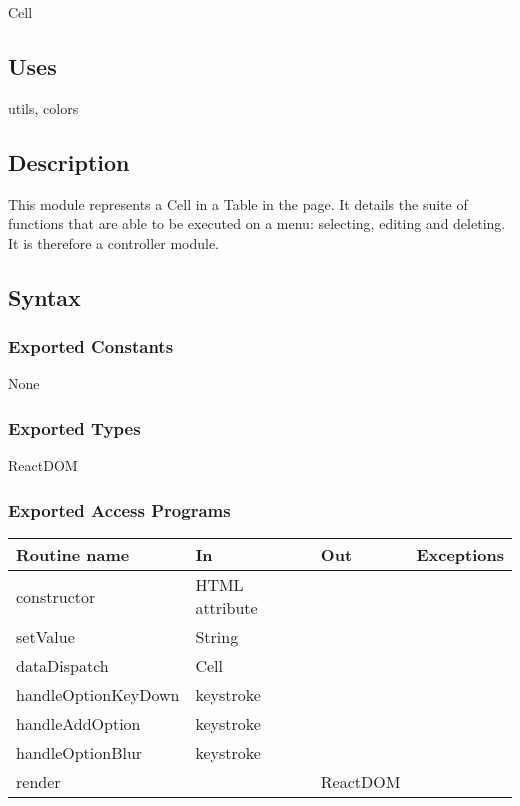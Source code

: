 \documentclass[12pt, titlepage]{article}
\begin{document}
Cell

\subsection{Uses}

utils, colors

\subsection{Description}
This module represents a Cell in a Table in the page. It details the suite of functions that are able to be executed on a menu: selecting, editing and deleting. It is therefore a controller module.

\subsection{Syntax}

\subsubsection{Exported Constants}

None

\subsubsection{Exported Types}

ReactDOM

\subsubsection{Exported Access Programs}

\begin{tabular}{| l | l | l | l |}
  \hline
  \textbf{Routine name} & \textbf{In} & \textbf{Out} & \textbf{Exceptions}\\
  \hline
  constructor & HTML attribute & ~ & ~\\
  \hline
  setValue & String & ~ & ~\\
  \hline
  dataDispatch & Cell & ~ & ~\\
  \hline
  handleOptionKeyDown & keystroke & ~ & ~\\
  \hline
  handleAddOption & keystroke & ~ & ~\\
  \hline
  handleOptionBlur & keystroke & ~ & ~\\
  \hline
  render & ~ & ReactDOM & ~\\
  \hline
\end{tabular}
\end{document}
